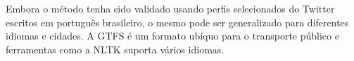 \documentclass[
	12pt,				%
	oneside,			%
	a4paper,			%
	english,			%
	brazil				%
	]{abntex2ppgsi}
\begin{document}
{{{Embora o método tenha sido validado usando perfis selecionados do Twitter escritos em português brasileiro, o mesmo pode ser generalizado para diferentes idiomas e cidades. A GTFS é um formato ubíquo para o transporte público e ferramentas como a NLTK suporta vários idiomas.





}}}
\end{document}
